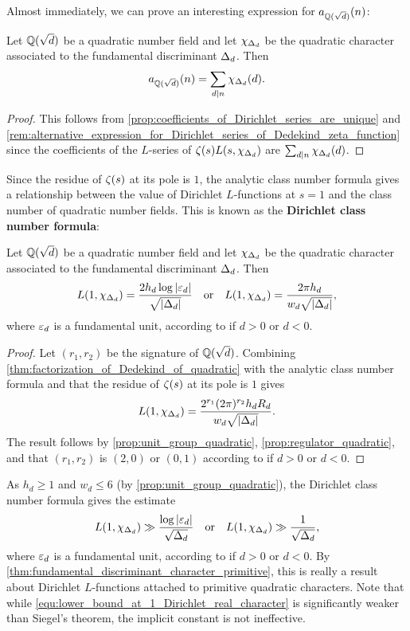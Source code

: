    Almost immediately, we can prove an interesting expression for $a_{\mathbb{Q}(\sqrt{d})}(n)$:

    \begin{proposition}
      Let $\mathbb{Q}(\sqrt{d})$ be a quadratic number field and let $\chi_{\Delta_{d}}$ be the quadratic character associated to the fundamental discriminant $\Delta_{d}$. Then
      \[
        a_{\mathbb{Q}(\sqrt{d})}(n) = \sum_{d \mid n}\chi_{\Delta_{d}}(d).
      \]
    \end{proposition}
    \begin{proof}
      This follows from \cref{prop:coefficients_of_Dirichlet_series_are_unique} and \cref{rem:alternative_expression_for_Dirichlet_series_of_Dedekind_zeta_function} since the coefficients of the $L$-series of $\zeta(s)L(s,\chi_{\Delta_{d}})$ are $\sum_{d \mid n}\chi_{\Delta_{d}}(d)$.
    \end{proof}

    Since the residue of $\zeta(s)$ at its pole is $1$, the analytic class number formula gives a relationship between the value of Dirichlet $L$-functions at $s = 1$ and the class number of quadratic number fields. This is known as the \textbf{Dirichlet class number formula}:

    \begin{corollary*}
      Let $\mathbb{Q}(\sqrt{d})$ be a quadratic number field and let $\chi_{\Delta_{d}}$ be the quadratic character associated to the fundamental discriminant $\Delta_{d}$. Then
      \[
        L(1,\chi_{\Delta_{d}}) = \frac{2h_{d}\log|\varepsilon_{d}|}{\sqrt{|\Delta_{d}|}} \quad \text{or} \quad L(1,\chi_{\Delta_{d}}) = \frac{2\pi h_{d}}{w_{d}\sqrt{|\Delta_{d}|}},
      \]
      where $\varepsilon_{d}$ is a fundamental unit, according to if $d > 0$ or $d < 0$.
    \end{corollary*}
    \begin{proof}
      Let $(r_{1},r_{2})$ be the signature of $\mathbb{Q}(\sqrt{d})$. Combining \cref{thm:factorization_of_Dedekind_of_quadratic} with the analytic class number formula and that the residue of $\zeta(s)$ at its pole is $1$ gives
      \[
        L(1,\chi_{\Delta_{d}}) = \frac{2^{r_{1}}(2\pi)^{r_{2}}h_{d}R_{d}}{w_{d}\sqrt{|\Delta_{d}|}}.
      \]
      The result follows by \cref{prop:unit_group_quadratic}, \cref{prop:regulator_quadratic}, and that $(r_{1},r_{2})$ is $(2,0)$ or $(0,1)$ according to if $d > 0$ or $d < 0$.
    \end{proof}
    
    As $h_{d} \ge 1$ and $w_{d} \le 6$ (by \cref{prop:unit_group_quadratic}), the Dirichlet class number formula gives the estimate
    \begin{equation}\label{equ:lower_bound_at_1_Dirichlet_real_character}
      L(1,\chi_{\Delta_{d}}) \gg \frac{\log|\varepsilon_{d}|}{\sqrt{\Delta_{d}}} \quad \text{or} \quad L(1,\chi_{\Delta_{d}}) \gg \frac{1}{\sqrt{\Delta_{d}}},
    \end{equation}
    where $\varepsilon_{d}$ is a fundamental unit, according to if $d > 0$ or $d < 0$. By \cref{thm:fundamental_discriminant_character_primitive}, this is really a result about Dirichlet $L$-functions attached to primitive quadratic characters. Note that while \cref{equ:lower_bound_at_1_Dirichlet_real_character} is significantly weaker than Siegel's theorem, the implicit constant is not ineffective.
